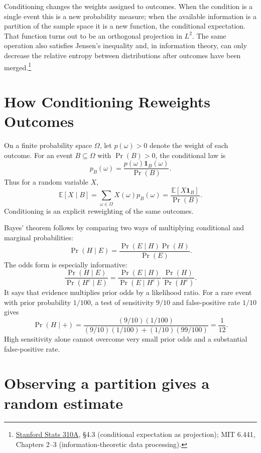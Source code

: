 
Conditioning changes the weights assigned to outcomes. When the condition is a single event this is a new probability measure; when the available information is a partition of the sample space it is a new function, the conditional expectation. That function turns out to be an orthogonal projection in \(L^2\). The same operation also satisfies Jensen's inequality and, in information theory, can only decrease the relative entropy between distributions after outcomes have been merged.\footnote{\href{https://web.stanford.edu/class/stats310a/lnotes.pdf}{Stanford Stats 310A}, \S4.3 (conditional expectation as projection); MIT 6.441, Chapters 2--3 (information-theoretic data processing).}

\section{How Conditioning Reweights Outcomes}

On a finite probability space \(\Omega\), let \(p(\omega)>0\) denote the weight of each outcome. For an event \(B\subseteq\Omega\) with \(\Pr(B)>0\), the conditional law is
\[
 p_B(\omega)=\frac{p(\omega)\mathbf1_B(\omega)}{\Pr(B)}.
\]
Thus for a random variable \(X\),
\[
 \mathbb E[X\mid B]
 =\sum_{\omega\in\Omega}X(\omega)p_B(\omega)
 =\frac{\mathbb E[X\mathbf1_B]}{\Pr(B)}.
\]
Conditioning is an explicit reweighting of the same outcomes.

Bayes' theorem follows by comparing two ways of multiplying conditional and marginal probabilities:
\[
 \Pr(H\mid E)=\frac{\Pr(E\mid H)\Pr(H)}{\Pr(E)}.
\]
The odds form is especially informative:
\[
 \boxed{\frac{\Pr(H\mid E)}{\Pr(H^c\mid E)}
 =\frac{\Pr(E\mid H)}{\Pr(E\mid H^c)}
  \frac{\Pr(H)}{\Pr(H^c)}.}
\]
It says that evidence multiplies prior odds by a likelihood ratio. For a rare event with prior probability \(1/100\), a test of sensitivity \(9/10\) and false-positive rate \(1/10\) gives
\[
 \Pr(H\mid +)
 =\frac{(9/10)(1/100)}
 {(9/10)(1/100)+(1/10)(99/100)}
 =\frac1{12}.
\]
High sensitivity alone cannot overcome very small prior odds and a substantial false-positive rate.

\section{Observing a partition gives a random estimate}

